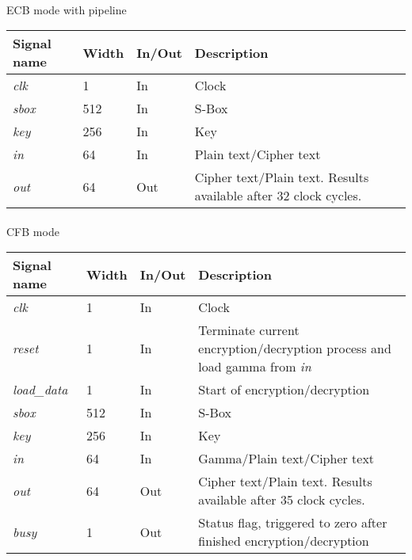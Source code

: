 \documentclass[a4paper,12pt]{article}
\begin{document}
\paragraph{}
ECB mode with pipeline\\
{\renewcommand{\arraystretch}{1.2}
\begin{tabularx}{\textwidth}{l|l l X}
\hline
Signal name & Width & In/Out & Description\\
\hline
\textsl{clk}        & 1   & In  & Clock\\
\textsl{sbox}       & 512 & In  & S-Box \\
\textsl{key}        & 256 & In  & Key \\
\textsl{in}         & 64  & In  & Plain text/Cipher text \\
\textsl{out}        & 64  & Out & Cipher text/Plain text. Results available after 32 clock cycles. \\
\hline
\end{tabularx}}

\paragraph{}
CFB mode\\
{\renewcommand{\arraystretch}{1.2}
\begin{tabularx}{\textwidth}{l|l l X}
\hline
Signal name & Width & In/Out & Description\\
\hline
\textsl{clk}        & 1   & In  & Clock\\
\textsl{reset}      & 1   & In  & Terminate current encryption/decryption process and load gamma from \textsl{in} \\
\textsl{load\_data} & 1   & In  & Start of encryption/decryption \\
\textsl{sbox}       & 512 & In  & S-Box \\
\textsl{key}        & 256 & In  & Key \\
\textsl{in}         & 64  & In  & Gamma/Plain text/Cipher text \\
\textsl{out}        & 64  & Out & Cipher text/Plain text. Results available after 35 clock cycles. \\
\textsl{busy}       & 1   & Out & Status flag, triggered to zero after finished encryption/decryption \\
\hline
\end{tabularx}}
\end{document}
